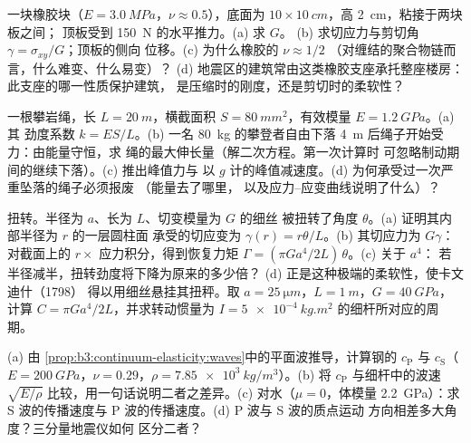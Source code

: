 \begin{exercise}[$\star\star$]\label{exo:b3:continuum-elasticity:6}
一块橡胶块（$E = \qty{3.0}{MPa}$，$\nu \approx 0.5$），底面为 $10
\times \qty{10}{cm}$，高 \qty{2}{cm}，粘接于两块板之间；
顶板受到 \qty{150}{N} 的水平推力。(a) 求 $G$。
(b) 求切应力与剪切角 $\gamma = \sigma_{xy}/G$；顶板的侧向
位移。(c) 为什么橡胶的 $\nu \approx 1/2$
（对缠结的聚合物链而言，什么难变、什么易变）？
(d) 地震区的建筑常由这类橡胶支座承托整座楼房：
此支座的哪一性质保护建筑，
是压缩时的刚度，还是剪切时的柔软性？
\end{exercise}

\begin{exercise}[$\star\star$]\label{exo:b3:continuum-elasticity:7}
一根攀岩绳，长 $L = \qty{20}{m}$，横截面积 $S =
\qty{80}{mm^2}$，有效模量 $E = \qty{1.2}{GPa}$。(a) 其
劲度系数 $k = ES/L$。(b) 一名 \qty{80}{kg} 的攀登者自由下落
\qty{4}{m} 后绳子开始受力：由能量守恒，求
绳的最大伸长量（解二次方程。第一次计算时
可忽略制动期间的继续下落）。(c) 推出峰值力与
以 $g$ 计的峰值减速度。(d) 为何承受过一次严重坠落的绳子必须报废
（能量去了哪里，
以及应力–应变曲线说明了什么）？
\end{exercise}

\begin{exercise}[$\star\star$]\label{exo:b3:continuum-elasticity:8}
扭转。半径为 $a$、长为 $L$、切变模量为 $G$ 的细丝
被扭转了角度 $\theta$。(a) 证明其内部半径为 $r$ 的一层圆柱面
承受的切应变为 $\gamma(r) = r\theta/L$。(b) 其切应力为
$G\gamma$：对截面上的 $r \times$ 应力积分，得到恢复力矩
$\Gamma = (\pi Ga^4/2L)\,\theta$。(c) 关于 $a^4$：
若半径减半，扭转劲度将下降为原来的多少倍？
(d) 正是这种极端的柔软性，使卡文迪什（1798）
得以用细丝悬挂其扭秤。取 $a = \qty{25}{\micro m}$，$L =
\qty{1}{m}$，$G = \qty{40}{GPa}$，计算 $C = \pi Ga^4/2L$，并求转动惯量为
$I = \qty{5e-4}{kg.m^2}$ 的细杆所对应的周期。
\end{exercise}

\begin{exercise}[$\star\star$]\label{exo:b3:continuum-elasticity:9}
(a) 由
\cref{prop:b3:continuum-elasticity:waves}中的平面波推导，计算钢的 $c_{\text{P}}$ 与
$c_{\text{S}}$（$E = \qty{200}{GPa}$，$\nu = 0.29$，$\rho =
\qty{7.85e3}{kg/m^3}$）。(b) 将 $c_{\text{P}}$ 与细杆中的波速
$\sqrt{E/\rho}$ 比较，用一句话说明二者之差异。(c)
对水（$\mu = 0$，体模量 \qty{2.2}{GPa}）：求 S 波的传播速度与
P 波的传播速度。(d) P 波与 S 波的质点运动
方向相差多大角度？三分量地震仪如何
区分二者？
\end{exercise}

